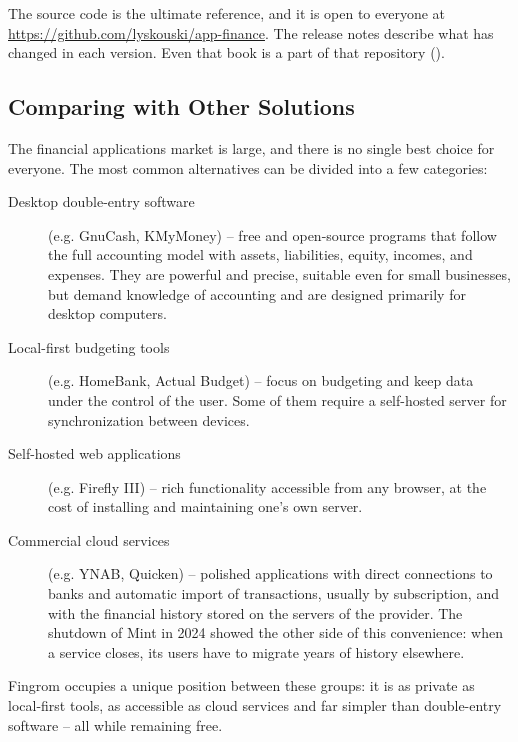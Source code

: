 \noindent The source code is the ultimate reference, and it is open to everyone at
\href{https://github.com/lyskouski/app-finance}{https://github.com/lyskouski/app-finance}. The
release notes describe what has changed in each version. Even that book is a part of that
repository ().


\subsection{Comparing with Other Solutions}

The financial applications market is large, and there is no single best choice for everyone.
The most common alternatives can be divided into a few categories:

\begin{description}
  \item[Desktop double-entry software] (e.g. GnuCash, KMyMoney) -- free and open-source
  programs that follow the full accounting model with assets, liabilities, equity, incomes,
  and expenses. They are powerful and precise, suitable even for small businesses, but demand
  knowledge of accounting and are designed primarily for desktop computers.
  \item[Local-first budgeting tools] (e.g. HomeBank, Actual Budget) -- focus on budgeting and
  keep data under the control of the user. Some of them require a self-hosted server for
  synchronization between devices.
  \item[Self-hosted web applications] (e.g. Firefly III) -- rich functionality accessible
  from any browser, at the cost of installing and maintaining one's own server.
  \item[Commercial cloud services] (e.g. YNAB, Quicken) -- polished applications with direct
  connections to banks and automatic import of transactions, usually by subscription, and
  with the financial history stored on the servers of the provider. The shutdown of Mint in
  2024 showed the other side of this convenience: when a service closes, its users have to
  migrate years of history elsewhere.
\end{description}

\noindent Fingrom occupies a unique position between these groups: it is as private as
local-first tools, as accessible as cloud services and far simpler than double-entry software
-- all while remaining free.

